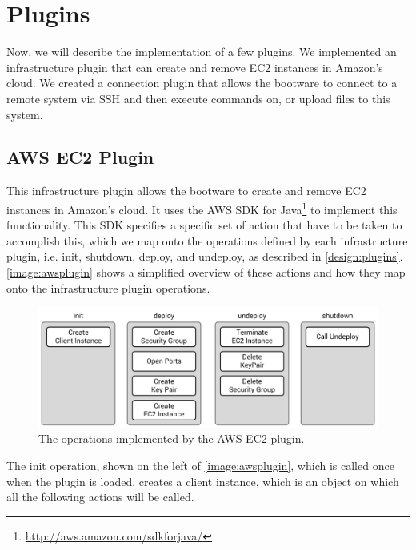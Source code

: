 \section{Plugins}
\label{implementation:plugins}

Now, we will describe the implementation of a few plugins.
We implemented an infrastructure plugin that can create and remove EC2 instances in Amazon's cloud.
We created a connection plugin that allows the bootware to connect to a remote system via SSH and then execute commands on, or upload files to this system.

\subsection{AWS EC2 Plugin}

This infrastructure plugin allows the bootware to create and remove EC2 instances in Amazon's cloud.
It uses the AWS SDK for Java\footnote{\url{http://aws.amazon.com/sdkforjava/}} to implement this functionality.
This SDK specifies a specific set of action that have to be taken to accomplish this, which we map onto the operations defined by each infrastructure plugin, i.e. init, shutdown, deploy, and undeploy, as described in \autoref{design:plugins}.
\autoref{image:awsplugin} shows a simplified overview of these actions and how they map onto the infrastructure plugin operations.

\begin{figure}[!htbp]
	\centering
	\includegraphics[resolution=600]{implementation/assets/aws_plugin}
	\caption{The operations implemented by the AWS EC2 plugin.}
	\label{image:awsplugin}
\end{figure}

The init operation, shown on the left of \autoref{image:awsplugin}, which is called once when the plugin is loaded, creates a client instance, which is an object on which all the following actions will be called.

